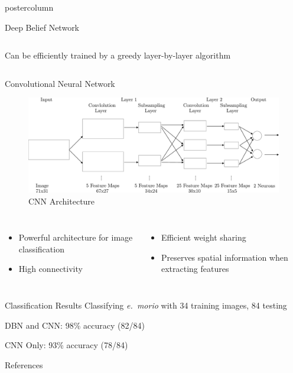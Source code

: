 \documentclass[final]{beamer}
\begin{document}
\begin{frame}
\begin{columns}
\begin{column}{.33\textwidth}
\begin{beamercolorbox}[center,wd=\textwidth]{postercolumn}
\begin{minipage}[T]{.95\textwidth}
{\begin{block}{Deep Belief Network}
\begin{columns}
\begin{itemize}
                      Can be efficiently trained by a greedy layer-by-layer
                      algorithm
                      \end{itemize}              
                \end{columns}
            \end{block}
            \vfill
            \begin{block}{Convolutional Neural Network}
            \begin{figure}[htbp]
               \centering
               \includegraphics[height=4\baselineskip]{cnnarch} %
               \caption{CNN Architecture}
            \end{figure}
            \begin{columns}
                \begin{itemize}
                \item Powerful architecture for image classification
                \item High connectivity
                \end{itemize}
                \begin{itemize}
                \item Efficient weight sharing
                \item Preserves spatial information when extracting features
                \end{itemize}
            \end{columns}
            \end{block}
            \vfill
            \begin{block}{Classification Results}
             Classifying {\it e.~morio} with 
             34 training images, 84 testing

             DBN and CNN: 98\% accuracy (82/84)

             CNN Only: 93\% accuracy (78/84)
            \end{block}
            \vfill
            \begin{block}{References}
              \nocite{Xiao:2008vn}
              \nocite{Tao:2008bh}
              \nocite{Kittler:1986zr}
              \nocite{Ila05}
             \def\newblock{}\small
	    
  	    
	    

\end{block}}
\end{minipage}
\end{beamercolorbox}
\end{column}
\end{columns}
\end{frame}
\end{document}
